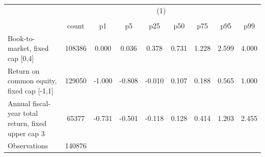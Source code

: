 {
\def\sym#1{\ifmmode^{#1}\else\(^{#1}\)\fi}
\begin{tabular}{l*{1}{cccccccc}}
\hline\hline
                    &\multicolumn{8}{c}{(1)}                                                                                \\
                    &\multicolumn{8}{c}{}                                                                                   \\
                    &       count&          p1&          p5&         p25&         p50&         p75&         p95&         p99\\
\hline
Book-to-market, fixed cap [0,4]&      108386&       0.000&       0.036&       0.378&       0.731&       1.228&       2.599&       4.000\\
Return on common equity, fixed cap [-1,1]&      129050&      -1.000&      -0.808&      -0.010&       0.107&       0.188&       0.565&       1.000\\
Annual fiscal-year total return, fixed upper cap 3&       65377&      -0.731&      -0.501&      -0.118&       0.128&       0.414&       1.203&       2.455\\
\hline
Observations        &      140876&            &            &            &            &            &            &            \\
\hline\hline
\end{tabular}
}

